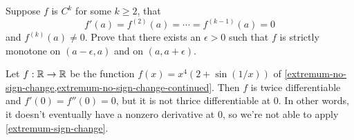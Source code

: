 \begin{exercise} \label{extremum-sign-change}
	Suppose $f$ is $C^k$ for some $k \geq 2$, that
	\[ f'(a) = f^{(2)}(a) = \dotsb = f^{(k-1)}(a) = 0 \] and $f^{(k)}(a) \neq 0$. Prove that there exists an $\epsilon > 0$ such that $f$ is strictly monotone on $(a-\epsilon, a)$ and on $(a, a+\epsilon)$. 
\end{exercise}

\begin{example} \label{extremum-no-sign-change-final}
	Let $f : \mathbb{R} \to \mathbb{R}$ be the function $f(x) = x^4(2 + \sin(1/x))$ of \cref{extremum-no-sign-change,extremum-no-sign-change-continued}. Then $f$ is twice differentiable and $f'(0) = f''(0) = 0$, but it is not thrice differentiable at 0. In other words, it doesn't eventually have a nonzero derivative at 0, so we're not able to apply \cref{extremum-sign-change}. 
\end{example}

